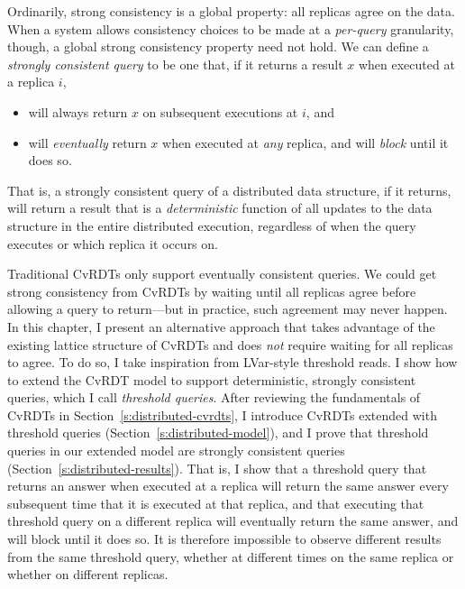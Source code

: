 Ordinarily, strong consistency is a global property: all replicas
agree on the data.  When a system allows consistency choices to be
made at a \emph{per-query} granularity, though, a global strong
consistency property need not hold.  We can define a \emph{strongly
consistent query} to be one that, if it returns a result $x$ when
executed at a replica $i$,
\begin{itemize}
  \item will always return $x$ on subsequent executions at $i$, and
  \item will \emph{eventually} return $x$ when executed at \emph{any}
    replica, and will \emph{block} until it does so.
\end{itemize}
That is, a strongly consistent query of a distributed data structure,
if it returns, will return a result that is a \emph{deterministic}
function of all updates to the data structure in the entire
distributed execution, regardless of when the query executes or which
replica it occurs on.

Traditional CvRDTs only support eventually consistent queries.  We
could get strong consistency from CvRDTs by waiting until all replicas
agree before allowing a query to return---but in practice, such
agreement may never happen.  In this chapter, I present an alternative
approach that takes advantage of the existing lattice structure of
CvRDTs and does \emph{not} require waiting for all replicas to agree.
To do so, I take inspiration from LVar-style threshold reads.  I show
how to extend the CvRDT model to support deterministic, strongly
consistent queries, which I call \emph{threshold queries}.  After
reviewing the fundamentals of CvRDTs in
Section~\ref{s:distributed-cvrdts}, I introduce CvRDTs extended with
threshold queries (Section~\ref{s:distributed-model}), and I prove
that threshold queries in our extended model are strongly consistent
queries (Section~\ref{s:distributed-results}).  That is, I show that a
threshold query that returns an answer when executed at a replica will
return the same answer every subsequent time that it is executed at
that replica, and that executing that threshold query on a different
replica will eventually return the same answer, and will block until
it does so.  It is therefore impossible to observe different results
from the same threshold query, whether at different times on the same
replica or whether on different replicas.
